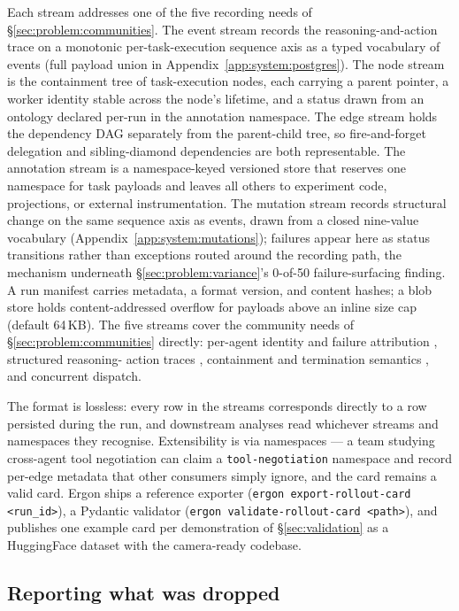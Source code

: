 \documentclass{article}
\begin{document}
Each stream addresses one of the five recording needs of
\S\ref{sec:problem:communities}. The event stream records
the reasoning-and-action trace on a monotonic per-task-execution
sequence axis as a typed vocabulary of events (full payload
union in Appendix~\ref{app:system:postgres}).
The node stream is the containment tree of task-execution
nodes, each carrying a parent pointer, a worker identity stable
across the node's lifetime, and a status drawn from an ontology
declared per-run in the annotation namespace.
The edge stream holds the dependency DAG separately from the
parent-child tree, so fire-and-forget delegation and
sibling-diamond dependencies are both representable.
The annotation stream is a namespace-keyed versioned store
that reserves one namespace for task payloads and leaves all
others to experiment code, projections, or external
instrumentation.
The mutation stream records structural change on the same
sequence axis as events, drawn from a closed nine-value
vocabulary (Appendix~\ref{app:system:mutations}); failures
appear here as status transitions rather than exceptions
routed around the recording path, the mechanism underneath
\S\ref{sec:problem:variance}'s 0-of-50 failure-surfacing
finding.
A run manifest carries metadata, a format version, and content
hashes; a blob store holds content-addressed overflow for
payloads above an inline size cap (default 64\,KB). The five streams cover the
community needs of \S\ref{sec:problem:communities} directly:
per-agent identity and failure attribution
\citep{cemri2025mast, wang2024naht}, structured reasoning-%
action traces \citep{wang2025ragen, chen2025loop}, containment
and termination semantics \citep{bacon2017optioncritic,
zhu2024redel}, and concurrent dispatch.

The format is lossless: every row in the streams corresponds
directly to a row persisted during the run, and downstream
analyses read whichever streams and namespaces they recognise.
Extensibility is via namespaces --- a team studying cross-agent
tool negotiation can claim a \texttt{tool-negotiation}
namespace and record per-edge metadata that other consumers
simply ignore, and the card remains a valid card. Ergon ships
a reference exporter (\texttt{ergon export-rollout-card
<run\_id>}), a Pydantic validator
(\texttt{ergon validate-rollout-card <path>}), and publishes
one example card per demonstration of \S\ref{sec:validation}
as a HuggingFace dataset with the camera-ready codebase.

\subsection{Reporting what was dropped}
\label{sec:system:drops}
\end{document}
